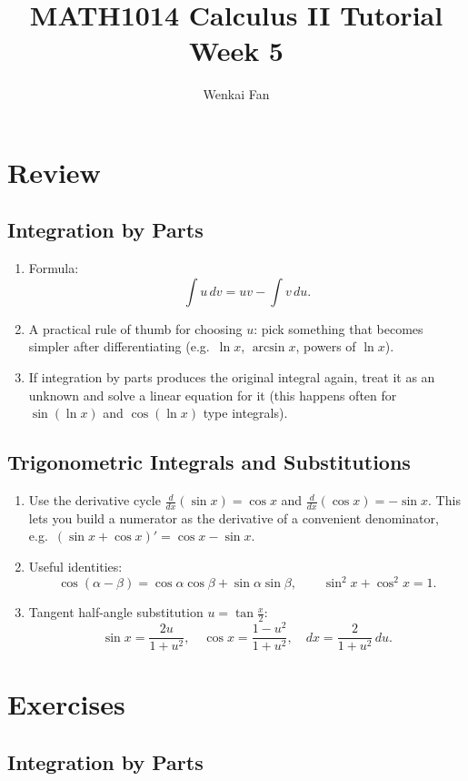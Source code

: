 \documentclass[11pt]{article}
\title{\vspace{-1.0em}MATH1014 Calculus II Tutorial\\Week 5}
\author{Wenkai Fan}
\date{}
\theoremstyle{definition}
\begin{document}
\maketitle
\thispagestyle{fancy}

\section{Review}

\subsection{Integration by Parts}
\begin{enumerate}
  \item Formula:
  \[
  \int u\,dv = uv-\int v\,du.
  \]
  \item A practical rule of thumb for choosing $u$: pick something that becomes simpler after differentiating (e.g.\ $\ln x$, $\arcsin x$, powers of $\ln x$).
  \item If integration by parts produces the original integral again, treat it as an unknown and solve a linear equation for it (this happens often for $\sin(\ln x)$ and $\cos(\ln x)$ type integrals).
\end{enumerate}

\subsection{Trigonometric Integrals and Substitutions}
\begin{enumerate}
  \item Use the derivative cycle $\frac{d}{dx}(\sin x)=\cos x$ and $\frac{d}{dx}(\cos x)=-\sin x$. This lets you build a numerator as the derivative of a convenient denominator, e.g.\ $(\sin x+\cos x)'=\cos x-\sin x$.
  \item Useful identities:
  \[
  \cos(\alpha-\beta)=\cos\alpha\cos\beta+\sin\alpha\sin\beta,
  \qquad
  \sin^2 x+\cos^2 x=1.
  \]
  \item Tangent half-angle substitution $u=\tan\frac{x}{2}$:
  \[
  \sin x=\frac{2u}{1+u^2},\quad
  \cos x=\frac{1-u^2}{1+u^2},\quad
  dx=\frac{2}{1+u^2}\,du.
  \]
\end{enumerate}

\section{Exercises}

\subsection{Integration by Parts}
\end{document}
